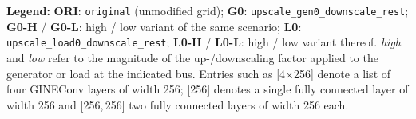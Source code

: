 \begin{table}[htbp]
  \vspace{0.5em}
  \begin{minipage}{\textwidth}
    \footnotesize
    \textbf{Legend:}
    \textbf{ORI}: \texttt{original} (unmodified grid);
    \textbf{G0}: \texttt{upscale\_gen0\_downscale\_rest};
    \textbf{G0-H} / \textbf{G0-L}: high / low variant of the same scenario;
    \textbf{L0}: \texttt{upscale\_load0\_downscale\_rest};
    \textbf{L0-H} / \textbf{L0-L}: high / low variant thereof.
    \emph{high} and \emph{low} refer to the magnitude of the up-/downscaling factor applied to the
    generator or load at the indicated bus. Entries such as
    \mbox{[4$\times$256]} denote a list of four GINEConv layers of width 256;
    \mbox{[256]} denotes a single fully connected layer of width 256 and
    \mbox{[256,\,256]} two fully connected layers of width 256 each.
  \end{minipage}
\end{table}

